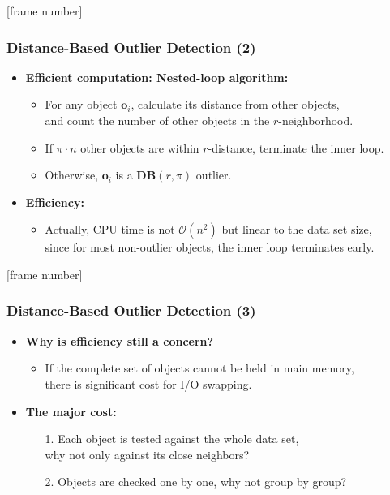 \documentclass[aspectratio=169,t,xcolor=dvipsnames]{beamer}
\begin{document}
{
  [frame number]
  \begin{frame}
  	\frametitle{Distance-Based Outlier Detection (2)}
  	\begin{itemize}
  		\item \textbf{Efficient computation: {\color{airforceblue}Nested-loop algorithm}:}
  		      \begin{itemize}
  		      	\item For any object $\mathbf{o}_i$, calculate its distance from other objects, \\
              and count the number of other objects in the $r$-neighborhood.
  		      	\item If $\pi \cdot n$ other objects are within $r$-distance, terminate the inner loop.
  		      	\item Otherwise, $\mathbf{o}_i$ is a $\mathbf{DB}(r, \pi)$ outlier.
  		      \end{itemize}
  		\item \textbf{Efficiency:}
  		      \begin{itemize}
  		      	\item Actually, CPU time is not $\mathcal{O}(n^2)$ but linear to the data set size,\\
              since for most non-outlier objects, the inner loop terminates early.
  		      \end{itemize}
  	\end{itemize}
  \end{frame}
}

{
  [frame number]
  \begin{frame}
  	\frametitle{Distance-Based Outlier Detection (3)}
  	\begin{itemize}
  		\item \textbf{Why is efficiency still a concern?}
  		      \begin{itemize}
  		      	\item If the complete set of objects cannot be held in main memory, \\
              there is significant cost for I/O swapping.
  		      \end{itemize}
  		\item \textbf{The major cost:}
  		      \begin{itemize}
  		      	\item[1.] Each object is tested against the whole data set, \\
  		      	why not only against its close neighbors?
  		      	\item[2.] Objects are checked one by one, why not group by group?
  		      \end{itemize}
  	\end{itemize}
  \end{frame}
}
\end{document}
